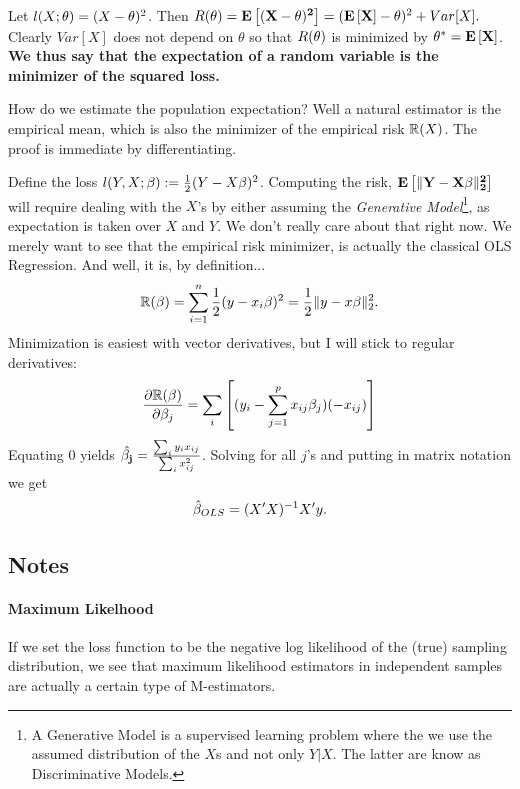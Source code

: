 \begin{example}
Let $l(X;\theta)=(X-\theta)^2$. Then 
$
	R(\theta) = 
	\mathbf{E}\left[ \mathbf{(X-\theta)^2} \right] = 
	(\mathbf{E}\left[ \mathbf{X} \right]-\theta)^2 + Var[X]. 
$
Clearly  $Var[X]$ does not depend on $\theta$  so that $R(\theta)$ is minimized by $\theta^*=\mathbf{E}\left[ \mathbf{X} \right]$.
\textbf{We thus say that the expectation of a random variable is the minimizer of the squared loss.}

How do we estimate the population expectation? Well a natural estimator is the empirical mean, which is also the minimizer of the empirical risk $\mathbb{R}(X)$. The proof is immediate by differentiating. 
\end{example}


\begin{example}
\label{eg:OLS}
Define the loss $l(Y,X;\beta):=\frac{1}{2}(Y-X\beta)^2$.
Computing the risk, $\mathbf{E}\left[ \mathbf{\Vert Y-X\beta \Vert_2^2} \right]$ will require dealing with the $X$'s by either assuming the \emph{Generative Model}\footnote{A Generative Model is a supervised learning problem where the we use the assumed distribution of the $X$s and not only $Y|X$. The latter are know as Discriminative Models.}, as expectation is taken over $X$ and $Y$. 
We don't really care about that right now. 
We merely want to see that the empirical risk minimizer, is actually the classical OLS Regression. And well, it is, by definition...
\begin{align*}
	\mathbb{R}(\beta)=\sum_{i=1}^n 	\frac{1}{2}(y-x_i\beta)^2 = \frac{1}{2}\Vert y-x\beta \Vert_2^2.
\end{align*}
Minimization is easiest with vector derivatives, but I will stick to regular derivatives:
\begin{align*}
	\frac{\partial \mathbb{R}(\beta)}{\partial {\beta_j}} = \sum_i \left[ (y_i-\sum_{j=1}^p x_{ij}\beta_j)(-x_{ij}) \right]
\end{align*}
Equating $0$ yields $\hat{\mathbf{\beta_j}}=\frac{\sum_i y_i x_{ij}}{\sum_i x_{ij}^2}$.
Solving for all $j$'s and putting in matrix notation we get
\begin{align}
	\hat{\mathbf{\beta}}_{OLS}=(X'X)^{-1} X'y.
\end{align}


\end{example}


\subsection{Notes}
\paragraph{Maximum Likelhood} 
If we set the loss function to be the negative log likelihood of the (true) sampling distribution, we see that maximum likelihood estimators in independent samples are actually a certain type of M-estimators.



